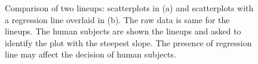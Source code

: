 \documentclass[12]{article}
\begin{document}
\begin{figure}[hbtp]
\centering
{}
\label{plottype}
	\vspace{-.1in}
\caption[Optional caption for list of figures]{Comparison of two lineups: scatterplots in (a) and scatterplots with a regression line overlaid in (b). The raw data is same for the lineups. The human subjects are shown the lineups and asked to identify the plot with the steepest slope. The presence of regression line may affect the decision of human subjects.  }
\end{figure}
\end{document}
